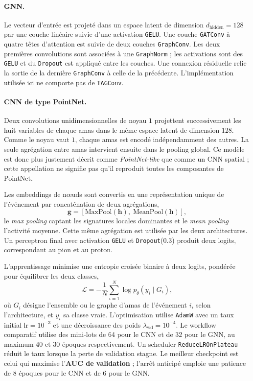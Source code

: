 \paragraph{GNN.} Le vecteur d'entrée est projeté dans un espace latent de dimension \(d_{\mathrm{hidden}} = 128\) par une couche linéaire suivie d'une activation \texttt{GELU}. Une couche \texttt{GATConv} à quatre têtes d'attention est suivie de deux couches \texttt{GraphConv}. Les deux premières convolutions sont associées à une \texttt{GraphNorm} ; les activations sont des \texttt{GELU} et du \texttt{Dropout} est appliqué entre les couches. Une connexion résiduelle relie la sortie de la dernière \texttt{GraphConv} à celle de la précédente. L'implémentation utilisée ici ne comporte pas de \texttt{TAGConv}.

\paragraph{CNN de type PointNet.} Deux convolutions unidimensionnelles de noyau $1$ projettent successivement les huit variables de chaque amas dans le même espace latent de dimension 128. Comme le noyau vaut $1$, chaque amas est encodé indépendamment des autres. La seule agrégation entre amas intervient ensuite dans le pooling global. Ce modèle est donc plus justement décrit comme \emph{PointNet-like} que comme un CNN spatial ; cette appellation ne signifie pas qu'il reproduit toutes les composantes de PointNet.

Les embeddings de nœuds sont convertis en une représentation unique de l'événement par concaténation de deux agrégations,
\[
\mathbf{g} =
\left[
\mathrm{MaxPool}(\mathbf{h}),
\;
\mathrm{MeanPool}(\mathbf{h})
\right],
\]
le \emph{max pooling} captant les signatures locales dominantes et le \emph{mean pooling} l'activité moyenne. Cette même agrégation est utilisée par les deux architectures. Un perceptron final avec activation \texttt{GELU} et \texttt{Dropout}(0.3) produit deux logits, correspondant au pion et au proton.

L'apprentissage minimise une entropie croisée binaire à deux logits, pondérée pour équilibrer les deux classes,
\[
\mathcal{L}
=
-\frac{1}{N}
\sum_{i=1}^{N}
\log p_{\theta}(y_i \mid G_i),
\]
où \(G_i\) désigne l'ensemble ou le graphe d'amas de l'événement \(i\), selon l'architecture, et \(y_i\) sa classe vraie. L'optimisation utilise \texttt{AdamW} avec un taux initial \(\mathrm{lr} = 10^{-3}\) et une décroissance des poids \(\lambda_{\mathrm{wd}} = 10^{-4}\). Le workflow comparatif utilise des mini-lots de 64 pour le CNN et de 32 pour le GNN, au maximum 40 et 30 époques respectivement. Un scheduler \texttt{ReduceLROnPlateau} réduit le taux lorsque la perte de validation stagne. Le meilleur checkpoint est celui qui maximise l'\textbf{AUC de validation} ; l'arrêt anticipé emploie une patience de 8 époques pour le CNN et de 6 pour le GNN.

